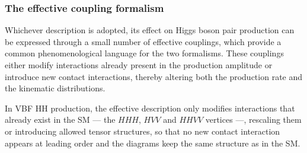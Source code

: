 




\subsubsection{The effective coupling formalism}
\label{subsubsec:eff_couplings}
%
Whichever description is adopted, its effect on Higgs boson pair production can be expressed through a small number of effective couplings, which provide a common phenomenological language for the two formalisms. These couplings either modify interactions already present in the production amplitude or introduce new contact interactions, thereby altering both the production rate and the kinematic distributions.

In VBF HH production, the effective description only modifies interactions that already exist in the SM — the $HHH$, $HVV$ and $HHVV$ vertices —, rescaling them or introducing allowed tensor structures, so that no new contact interaction appears at leading order and the diagrams keep the same structure as in the SM.

